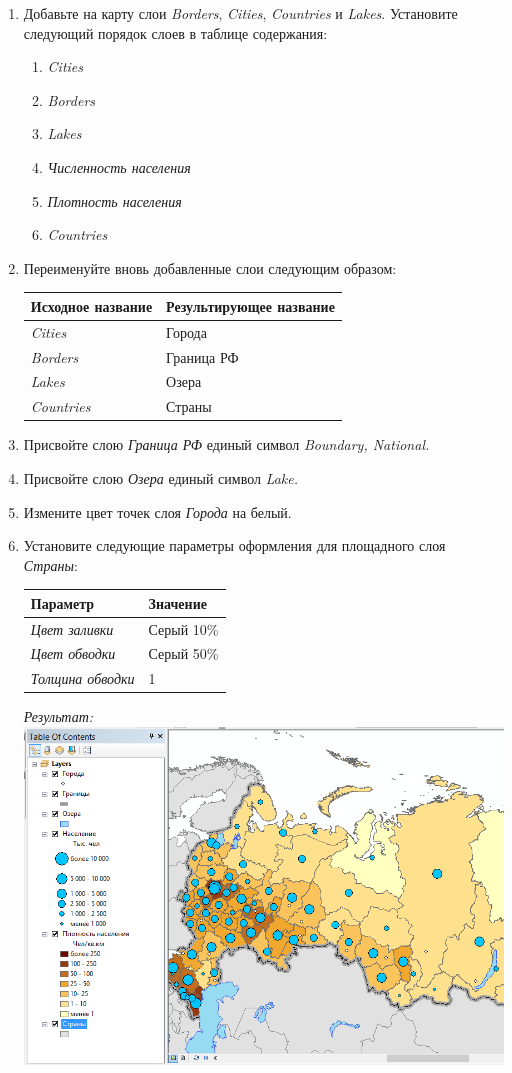 \documentclass[12pt,]{book}
\providecommand{\tightlist}{%
  \setlength{\itemsep}{0pt}\setlength{\parskip}{0pt}}
\begin{document}
\begin{enumerate}
\def\labelenumi{\arabic{enumi}.}
\item
  Добавьте на карту слои \emph{Borders}, \emph{Cities}, \emph{Countries} и \emph{Lakes}. Установите следующий порядок слоев в таблице содержания:

  \begin{enumerate}
  \def\labelenumii{\alph{enumii}.}
  \tightlist
  \item
    \emph{Cities}
  \item
    \emph{Borders}
  \item
    \emph{Lakes}
  \item
    \emph{Численность населения}
  \item
    \emph{Плотность населения}
  \item
    \emph{Countries}
  \end{enumerate}
\item
  Переименуйте вновь добавленные слои следующим образом:

  \begin{longtable}[]{@{}ll@{}}
  \toprule
  \textbf{Исходное название} & \textbf{Результирующее название}\tabularnewline
  \midrule
  \endhead
  \emph{Cities} & Города\tabularnewline
  \emph{Borders} & Граница РФ\tabularnewline
  \emph{Lakes} & Озера\tabularnewline
  \emph{Countries} & Страны\tabularnewline
  \bottomrule
  \end{longtable}
\item
  Присвойте слою \emph{Граница РФ} единый символ \emph{Boundary, National.}
\item
  Присвойте слою \emph{Озера} единый символ \emph{Lake.}
\item
  Измените цвет точек слоя \emph{Города} на белый.
\item
  Установите следующие параметры оформления для площадного слоя \emph{Страны}:

  \begin{longtable}[]{@{}ll@{}}
  \toprule
  \textbf{Параметр} & \textbf{Значение}\tabularnewline
  \midrule
  \endhead
  \emph{Цвет заливки} & Серый 10\%\tabularnewline
  \emph{Цвет обводки} & Серый 50\%\tabularnewline
  \emph{Толщина обводки} & 1\tabularnewline
  \bottomrule
  \end{longtable}

  \emph{Результат:}
  \includegraphics{images/Ex04/image25.png}


\end{enumerate}
\end{document}
